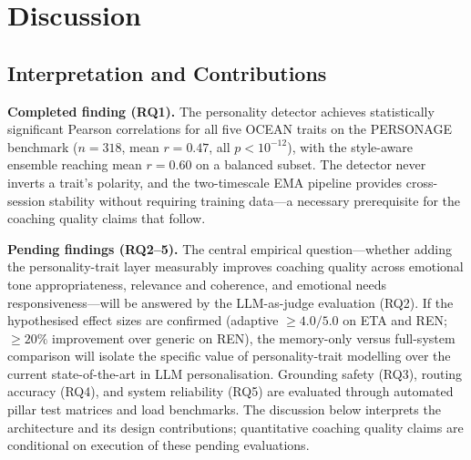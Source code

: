 \documentclass[10pt,a4paper]{report}
\begin{document}
\chapter{Discussion}
\label{ch:discussion}

\section{Interpretation and Contributions}

\textbf{Completed finding (RQ1).} The personality detector achieves statistically significant Pearson correlations for all five OCEAN traits on the PERSONAGE benchmark ($n = 318$, mean $r = 0.47$, all $p < 10^{-12}$), with the style-aware ensemble reaching mean $r = 0.60$ on a balanced subset. The detector never inverts a trait's polarity, and the two-timescale EMA pipeline provides cross-session stability without requiring training data---a necessary prerequisite for the coaching quality claims that follow.

\textbf{Pending findings (RQ2--5).} The central empirical question---whether adding the personality-trait layer measurably improves coaching quality across emotional tone appropriateness, relevance and coherence, and emotional needs responsiveness---will be answered by the LLM-as-judge evaluation (RQ2). If the hypothesised effect sizes are confirmed (adaptive $\geq 4.0/5.0$ on ETA and REN; $\geq 20\%$ improvement over generic on REN), the memory-only versus full-system comparison will isolate the specific value of personality-trait modelling over the current state-of-the-art in LLM personalisation. Grounding safety (RQ3), routing accuracy (RQ4), and system reliability (RQ5) are evaluated through automated pillar test matrices and load benchmarks. The discussion below interprets the architecture and its design contributions; quantitative coaching quality claims are conditional on execution of these pending evaluations.
\end{document}

